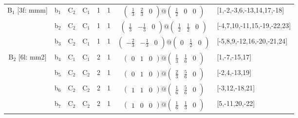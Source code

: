 \documentclass[fleqn,10pt,landscape]{article}
\begin{document}
\begin{itemize}
\begin{center}
\begin{longtable}{cc|cc|c|c|c|l}
B$_{1}$ [3f: mmm] & b$_{1}$ & C$_{2}$ & C$_{1}$ & 1 & 1 & $\begin{pmatrix} \frac{1}{3} & \frac{2}{3} & 0 \end{pmatrix}@\begin{pmatrix} \frac{1}{2} & 0 & 0 \end{pmatrix}$ & [1,-2,-3,6,-13,14,17,-18] \\
& b$_{2}$ & C$_{2}$ & C$_{1}$ & 1 & 1 & $\begin{pmatrix} \frac{1}{3} & - \frac{1}{3} & 0 \end{pmatrix}@\begin{pmatrix} \frac{1}{2} & \frac{1}{2} & 0 \end{pmatrix}$ & [-4,7,10,-11,15,-19,-22,23] \\
& b$_{3}$ & C$_{2}$ & C$_{1}$ & 1 & 1 & $\begin{pmatrix} - \frac{2}{3} & - \frac{1}{3} & 0 \end{pmatrix}@\begin{pmatrix} 0 & \frac{1}{2} & 0 \end{pmatrix}$ & [-5,8,9,-12,16,-20,-21,24] \\ \hline
B$_{2}$ [6l: mm2] & b$_{4}$ & C$_{1}$ & C$_{1}$ & 2 & 1 & $\begin{pmatrix} 0 & 1 & 0 \end{pmatrix}@\begin{pmatrix} \frac{1}{3} & \frac{1}{6} & 0 \end{pmatrix}$ & [1,-7,-15,17] \\
& b$_{5}$ & C$_{2}$ & C$_{2}$ & 2 & 1 & $\begin{pmatrix} 0 & 1 & 0 \end{pmatrix}@\begin{pmatrix} \frac{2}{3} & \frac{5}{6} & 0 \end{pmatrix}$ & [-2,4,-13,19] \\
& b$_{6}$ & C$_{2}$ & C$_{2}$ & 2 & 1 & $\begin{pmatrix} 1 & 1 & 0 \end{pmatrix}@\begin{pmatrix} \frac{1}{6} & \frac{5}{6} & 0 \end{pmatrix}$ & [-3,12,-18,21] \\
& b$_{7}$ & C$_{2}$ & C$_{2}$ & 2 & 1 & $\begin{pmatrix} 1 & 0 & 0 \end{pmatrix}@\begin{pmatrix} \frac{1}{6} & \frac{1}{3} & 0 \end{pmatrix}$ & [5,-11,20,-22] \\

\end{longtable}
\end{center}
\end{itemize}
\end{document}
